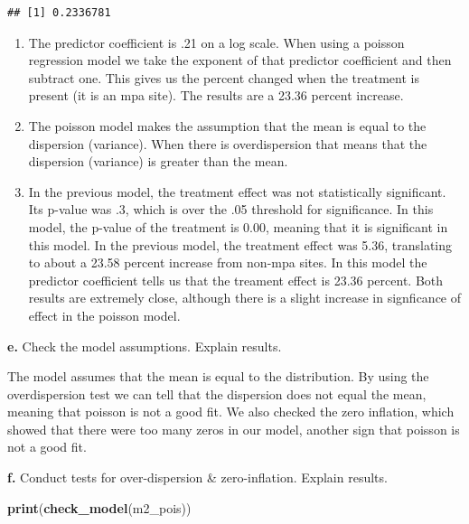 \documentclass[
]{article}
\newenvironment{Shaded}{\begin{snugshade}}{\end{snugshade}}
\newcommand{\FunctionTok}[1]{\textcolor[rgb]{0.13,0.29,0.53}{\textbf{#1}}}
\newcommand{\NormalTok}[1]{#1}
\begin{document}
\begin{verbatim}
## [1] 0.2336781
\end{verbatim}

\begin{enumerate}
\def\labelenumi{\alph{enumi}.}
\setcounter{enumi}{1}
\item
  The predictor coefficient is .21 on a log scale. When using a poisson
  regression model we take the exponent of that predictor coefficient
  and then subtract one. This gives us the percent changed when the
  treatment is present (it is an mpa site). The results are a 23.36
  percent increase.
\item
  The poisson model makes the assumption that the mean is equal to the
  dispersion (variance). When there is overdispersion that means that
  the dispersion (variance) is greater than the mean.
\item
  In the previous model, the treatment effect was not statistically
  significant. Its p-value was .3, which is over the .05 threshold for
  significance. In this model, the p-value of the treatment is 0.00,
  meaning that it is significant in this model. In the previous model,
  the treatment effect was 5.36, translating to about a 23.58 percent
  increase from non-mpa sites. In this model the predictor coefficient
  tells us that the treament effect is 23.36 percent. Both results are
  extremely close, although there is a slight increase in signficance of
  effect in the poisson model.
\end{enumerate}

\textbf{e.} Check the model assumptions. Explain results.

The model assumes that the mean is equal to the distribution. By using
the overdispersion test we can tell that the dispersion does not equal
the mean, meaning that poisson is not a good fit. We also checked the
zero inflation, which showed that there were too many zeros in our
model, another sign that poisson is not a good fit.

\textbf{f.} Conduct tests for over-dispersion \& zero-inflation. Explain
results.

\begin{Shaded}
\begin{Highlighting}[]
\FunctionTok{print}\NormalTok{(}\FunctionTok{check\_model}\NormalTok{(m2\_pois))}
\end{Highlighting}
\end{Shaded}
\end{document}
